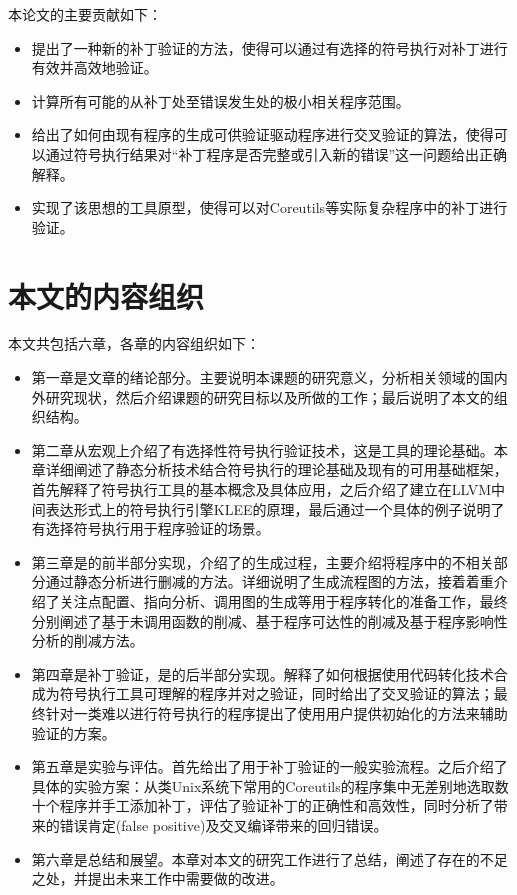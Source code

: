 本论文的主要贡献如下：
\begin{itemize}
\item 提出了一种新的补丁验证的方法，使得可以通过有选择的符号执行对补丁进行有效并高效地验证。
\item 计算所有可能的从补丁处至错误发生处的极小相关程序范围。
\item 给出了如何由现有程序的\rbscope 生成可供验证驱动程序进行交叉验证的算法，使得可以通过符号执行结果对“补丁程序是否完整或引入新的错误”这一问题给出正确解释。
\item 实现了该思想的工具原型\dryrun ，使得可以对Coreutils等实际复杂程序中的补丁进行验证。
\end{itemize}

\section{本文的内容组织}
\label{sec:struct}
本文共包括六章，各章的内容组织如下：
\begin{itemize}
\item 第一章是文章的绪论部分。主要说明本课题的研究意义，分析相关领域的国内外研究现状，然后介绍课题的研究目标以及所做的工作；最后说明了本文的组织结构。
\item 第二章从宏观上介绍了有选择性符号执行验证技术，这是\dryrun 工具的理论基础。本章详细阐述了静态分析技术结合符号执行的理论基础及现有的可用基础框架，首先解释了符号执行工具的基本概念及具体应用，之后介绍了建立在LLVM中间表达形式上的符号执行引擎KLEE的原理，最后通过一个具体的例子说明了有选择符号执行用于程序验证的场景。
\item 第三章是\dryrun 的前半部分实现，介绍了\rbscope 的生成过程，主要介绍将程序中的不相关部分通过静态分析进行删减的方法。详细说明了\rbscope 生成流程图的方法，接着着重介绍了关注点配置、指向分析、调用图的生成等用于程序转化的准备工作，最终分别阐述了基于未调用函数的削减、基于程序可达性的削减及基于程序影响性分析的削减方法。
\item 第四章是补丁验证，是\dryrun 的后半部分实现。解释了如何根据\rbscope 使用代码转化技术合成为符号执行工具可理解的程序并对之验证，同时给出了交叉验证的算法；最终针对一类难以进行符号执行的程序提出了使用用户提供初始化的方法来辅助验证的方案。
\item 第五章是实验与评估。首先给出了\dryrun 用于补丁验证的一般实验流程。之后介绍了具体的实验方案：从类Unix系统下常用的Coreutils的程序集中无差别地选取数十个程序并手工添加补丁，评估了\dryrun 验证补丁的正确性和高效性，同时分析了\dryrun 带来的错误肯定(false positive)及交叉编译带来的回归错误。
\item 第六章是总结和展望。本章对本文的研究工作进行了总结，阐述了\dryrun 存在的不足之处，并提出未来工作中需要做的改进。
\end{itemize}
